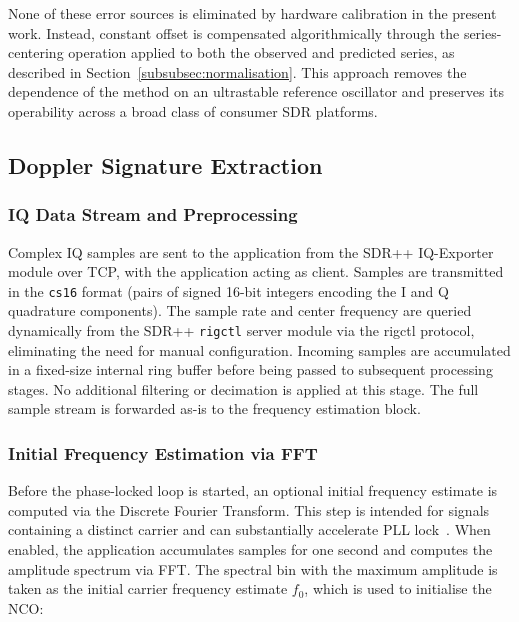 \documentclass[lineno,pdflatex,sn-basic,referee,]{sn-jnl}
\begin{document}
None of these error sources is eliminated by hardware calibration in the present work. Instead, constant offset is compensated algorithmically through the series-centering operation applied to both the observed and predicted series, as described in Section~\ref{subsubsec:normalisation}. This approach removes the dependence of the method on an ultrastable reference oscillator and preserves its operability across a broad class of consumer SDR platforms.


\subsection{Doppler Signature Extraction}
\label{subsec:doppler-extraction}

\subsubsection{IQ Data Stream and Preprocessing}
\label{subsubsec:iq-preprocessing}

Complex IQ samples are sent to the application from the SDR++ IQ-Exporter module over TCP, with the application acting as client. Samples are transmitted in the \texttt{cs16} format (pairs of signed 16-bit integers encoding the I and Q quadrature components). The sample rate and center frequency are queried dynamically from the SDR++ \texttt{rigctl} server module via the rigctl protocol, eliminating the need for manual configuration. Incoming samples are accumulated in a fixed-size internal ring buffer before being passed to subsequent processing stages. No additional filtering or decimation is applied at this stage. The full sample stream is forwarded as-is to the frequency estimation block.


\subsubsection{Initial Frequency Estimation via FFT}
\label{subsubsec:fft-estimation}

Before the phase-locked loop is started, an optional initial frequency estimate is computed via the Discrete Fourier Transform. This step is intended for signals containing a distinct carrier and can substantially accelerate PLL lock~\citep{gao2016}. When enabled, the application accumulates samples for one second and computes the amplitude spectrum via FFT. The spectral bin with the maximum amplitude is taken as the initial carrier frequency estimate $f_0$, which is used to initialise the NCO:
\end{document}
